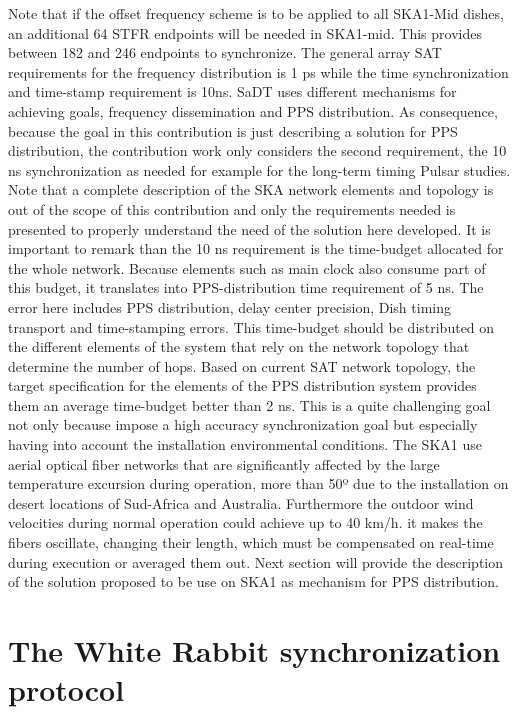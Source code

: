\documentclass[review]{elsarticle}
\begin{document}
Note that if the offset frequency scheme is to be applied to all SKA1-Mid dishes, an additional 64 STFR endpoints will be needed in SKA1-mid. This provides between 182 and 246 endpoints to synchronize. 
The general array SAT requirements for the frequency distribution is 1 ps while the time synchronization and time-stamp requirement is 10ns. SaDT uses different mechanisms for achieving goals, frequency dissemination and PPS distribution. As consequence, because the goal in this contribution is just describing a solution for PPS distribution, the contribution work only considers the second requirement, the 10 ns synchronization as needed for example for the long-term timing Pulsar studies. Note that a complete description of the SKA network elements and topology is out of the scope of this contribution and only the requirements needed is presented to properly understand the need of the solution here developed. 
It is important to remark than the 10 ns requirement is the time-budget allocated for the whole network. Because elements such as main clock also consume part of this budget, it translates into PPS-distribution time requirement of 5 ns. The error here includes PPS distribution, delay center precision, Dish timing transport and time-stamping errors. This time-budget should be distributed on the different elements of the system that rely on the network topology that determine the number of hops. Based on current SAT network topology, the target specification for the elements of the PPS distribution system provides them an average time-budget better than 2 ns. This is a quite challenging goal not only because impose a high accuracy synchronization goal but especially having into account the installation environmental conditions. The SKA1 use aerial optical fiber networks that are significantly affected by the large temperature excursion during operation, more than 50º due to the installation on desert locations of Sud-Africa and Australia. Furthermore the outdoor wind velocities during normal operation could achieve up to 40 km/h. it makes the fibers oscillate, changing their length, which must be compensated on real-time during execution or averaged them out. 
Next section will provide the description of the solution proposed to be use on SKA1 as mechanism for PPS distribution. 

\section{The White Rabbit synchronization protocol}
\end{document}

